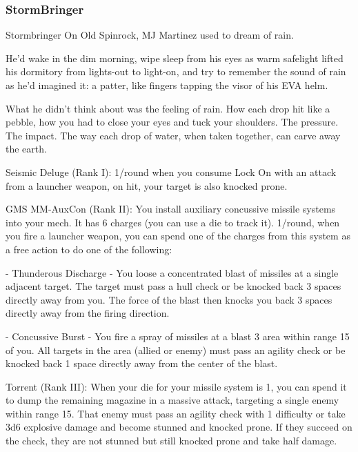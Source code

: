 \subsubsection{StormBringer}

                                                Stormbringer
On Old Spinrock, MJ Martinez used to dream of rain.

He’d wake in the dim morning, wipe sleep from his eyes as warm safelight lifted his dormitory
from lights-out to light-on, and try to remember the sound of rain as he’d imagined it: a patter, like
fingers tapping the visor of his EVA helm.

What he didn’t think about was the feeling of rain. How each drop hit like a pebble, how you had
to close your eyes and tuck your shoulders. The pressure. The impact.
The way each drop of water, when taken together, can carve away the earth.

Seismic Deluge (Rank I): 1/round when you consume Lock On with an attack from a launcher
weapon, on hit, your target is also knocked prone.

GMS MM-AuxCon (Rank II): You install auxiliary concussive missile systems into your mech. It
has 6 charges (you can use a die to track it). 1/round, when you fire a launcher weapon, you can
spend one of the charges from this system as a free action to do one of the following:

             -    Thunderous Discharge - You loose a concentrated blast of missiles at a single
                  adjacent target. The target must pass a hull check or be knocked back 3 spaces
                  directly away from you. The force of the blast then knocks you back 3 spaces
                  directly away from the firing direction.

             -    Concussive Burst - You fire a spray of missiles at a blast 3 area within range 15 of
                  you. All targets in the area (allied or enemy) must pass an agility check or be
                  knocked back 1 space directly away from the center of the blast.

Torrent (Rank III): When your die for your missile system is 1, you can spend it to dump the
remaining magazine in a massive attack, targeting a single enemy within range 15. That enemy
must pass an agility check with 1 difficulty or take 3d6 explosive damage and become stunned
and knocked prone. If they succeed on the check, they are not stunned but still knocked prone
and take half damage.
